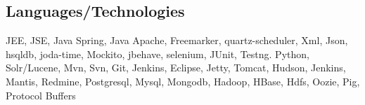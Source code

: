 


\subsection{Languages/Technologies}

\cventry
    {}{JEE, JSE, Java Spring, Java Apache, Freemarker, quartz-scheduler, Xml, Json, hsqldb, joda-time, Mockito, jbehave, selenium, JUnit, Testng. Python,
    Solr/Lucene, Mvn, Svn, Git, Jenkins, Eclipse, Jetty, Tomcat, Hudson, Jenkins, Mantis, Redmine, Postgresql, Mysql, Mongodb, Hadoop, HBase, Hdfs, Oozie,
    Pig, Protocol Buffers}{}{}{}{}
